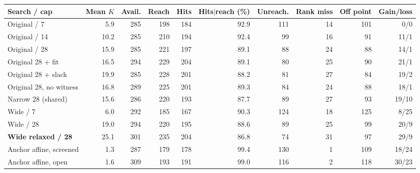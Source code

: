 \begin{tabular}{@{}lrrrrrrrrr@{}}
\toprule
Search / cap & Mean $K$ & Avail. & Reach & Hits & Hits$\mid$reach (\%) & Unreach. & Rank miss & Off point & Gain/loss \\
\midrule
Original / 7 & 5.9 & 285 & 198 & 184 & 92.9 & 111 & 14 & 101 & 0/0 \\
Original / 14 & 10.2 & 285 & 210 & 194 & 92.4 & 99 & 16 & 91 & 11/1 \\
Original / 28 & 15.9 & 285 & 221 & 197 & 89.1 & 88 & 24 & 88 & 14/1 \\
Original 28 + fit & 16.5 & 294 & 229 & 204 & 89.1 & 80 & 25 & 90 & 21/1 \\
Original 28 + slack & 19.9 & 285 & 228 & 201 & 88.2 & 81 & 27 & 84 & 19/2 \\
Original 28, no witness & 16.8 & 289 & 225 & 201 & 89.3 & 84 & 24 & 88 & 18/1 \\
Narrow 28 (shared) & 15.6 & 286 & 220 & 193 & 87.7 & 89 & 27 & 93 & 19/10 \\
Wide / 7 & 6.0 & 292 & 185 & 167 & 90.3 & 124 & 18 & 125 & 8/25 \\
Wide / 28 & 19.0 & 294 & 220 & 195 & 88.6 & 89 & 25 & 99 & 20/9 \\
\textbf{Wide relaxed / 28} & 25.1 & 301 & 235 & 204 & 86.8 & 74 & 31 & 97 & 29/9 \\
Anchor affine, screened & 1.3 & 287 & 179 & 178 & 99.4 & 130 & 1 & 109 & 18/24 \\
Anchor affine, open & 1.6 & 309 & 193 & 191 & 99.0 & 116 & 2 & 118 & 30/23 \\
\bottomrule
\end{tabular}
